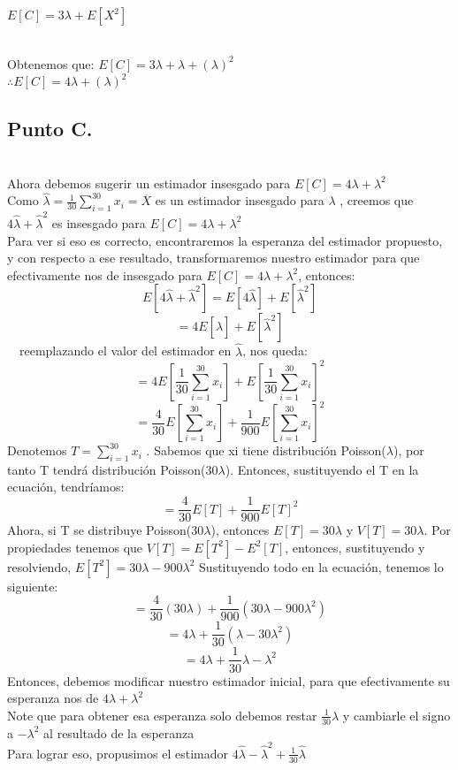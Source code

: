 \documentclass[letterpaper,12pt,onecolumn,titlepage]{article}
\begin{document}
$E[C]=3\lambda + E[X^2]$

~\\Obtenemos que: 
$E[C]=3\lambda + \lambda + (\lambda)^2$
~\\$\therefore E[C] = 4\lambda + (\lambda)^2$

\subsection{Punto C.}
~\\ Ahora debemos sugerir un estimador insesgado para $E[C] = 4\lambda + {\lambda}^2$
~\\ Como $\hat{\lambda}= \frac{1}{30} \sum_{i=1}^{30}x_{i} = \overline{X}$ es un estimador insesgado para $\lambda$ , creemos que $4\hat{\lambda}+\hat{\lambda}^2$ es insesgado para $E[C] = 4\lambda + {\lambda}^2$
~\\ Para ver si eso es correcto, encontraremos la esperanza del estimador propuesto, y con respecto a ese resultado, transformaremos nuestro estimador para que efectivamente nos de insesgado para $E[C] = 4\lambda + {\lambda}^2$, entonces:
~\\ $$E[4\hat{\lambda}+\hat{\lambda}^2]=E[4\hat{\lambda}]+E[\hat{\lambda}^2]$$
 $$=4E[\hat{\lambda}]+E[\hat{\lambda}^2]$$
~\ reemplazando el valor del estimador en $\hat{\lambda}$, nos queda:
$$=4E[\frac{1}{30}\sum_{i=1}^{30}x_{i}]+E[ \frac{1}{30} \sum_{i=1}^{30}x_{i}]^2$$
$$=\frac{4}{30}E[\sum_{i=1}^{30}x_{i}]+\frac{1}{900}E[\sum_{i=1}^{30}x_{i}]^2$$ 
Denotemos $T=\sum_{i=1}^{30}x_{i}$ . Sabemos que xi tiene distribuci\'{o}n Poisson($\lambda$), por tanto T tendr\'{a} distribuci\'{o}n Poisson($30\lambda$). Entonces, sustituyendo el T en la ecuaci\'{o}n, tendr\'{i}amos:
$$=\frac{4}{30}E[T]+\frac{1}{900}E[T]^2$$
Ahora, si T se distribuye Poisson($30\lambda$), entonces $E[T]=30\lambda$ y $V[T]=30\lambda$.
Por propiedades tenemos que $V[T]=E[T^2]-E^2[T]$, entonces, sustituyendo y resolviendo, $E[T^2]=30\lambda-900{\lambda}^2$
Sustituyendo todo en la ecuaci\'{o}n, tenemos lo siguiente:
$$=\frac{4}{30}(30\lambda)+\frac{1}{900}(30\lambda-900{\lambda}^2)$$ 
$$=4\lambda+\frac{1}{30}(\lambda-30{\lambda}^2)$$
$$=4\lambda+\frac{1}{30}\lambda-{\lambda}^2$$
Entonces, debemos modificar nuestro estimador inicial, para que efectivamente su esperanza nos de $4\lambda + {\lambda}^2$
~\\ Note que para obtener esa esperanza solo debemos restar $\frac{1}{30}\lambda$ y cambiarle el signo a $-{\lambda}^2$ al resultado de la esperanza
~\\ Para lograr eso, propusimos el estimador $4\hat{\lambda}-\hat{\lambda}^2+\frac{1}{30}\hat{\lambda}$
\end{document}
